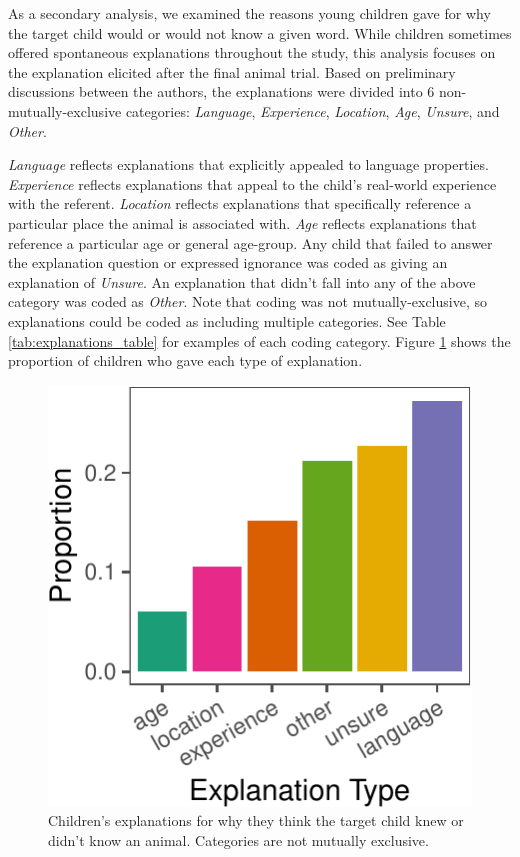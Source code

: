 \documentclass[10pt, letterpaper]{article}
\newenvironment{CodeChunk}{}{}
\begin{document}
As a secondary analysis, we examined the reasons young children gave for
why the target child would or would not know a given word. While
children sometimes offered spontaneous explanations throughout the
study, this analysis focuses on the explanation elicited after the final
animal trial. Based on preliminary discussions between the authors, the
explanations were divided into 6 non-mutually-exclusive categories:
\emph{Language}, \emph{Experience}, \emph{Location}, \emph{Age},
\emph{Unsure}, and \emph{Other}.

\emph{Language} reflects explanations that explicitly appealed to
language properties. \emph{Experience} reflects explanations that appeal
to the child's real-world experience with the referent. \emph{Location}
reflects explanations that specifically reference a particular place the
animal is associated with. \emph{Age} reflects explanations that
reference a particular age or general age-group. Any child that failed
to answer the explanation question or expressed ignorance was coded as
giving an explanation of \emph{Unsure}. An explanation that didn't fall
into any of the above category was coded as \emph{Other}. Note that
coding was not mutually-exclusive, so explanations could be coded as
including multiple categories. See Table \ref{tab:explanations_table}
for examples of each coding category. Figure \ref{fig:explanations}
shows the proportion of children who gave each type of explanation.

\begin{CodeChunk}
\begin{figure}[tb]
\includegraphics{figs/explanations-1} \caption[Children's explanations for why they think the target child knew or didn't know an animal]{Children's explanations for why they think the target child knew or didn't know an animal. Categories are not mutually exclusive.}\label{fig:explanations}
\end{figure}
\end{CodeChunk}
\end{document}
